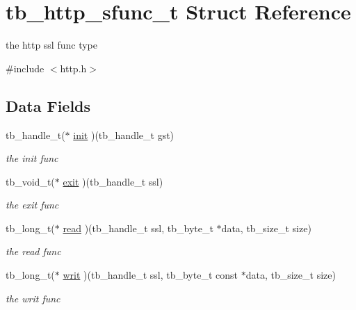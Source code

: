 \hypertarget{structtb__http__sfunc__t}{\section{tb\-\_\-http\-\_\-sfunc\-\_\-t Struct Reference}
\label{d7/dff/structtb__http__sfunc__t}
}


the http ssl func type  




{\ttfamily \#include $<$http.\-h$>$}

\subsection*{Data Fields}
\begin{DoxyCompactItemize}
\item 
\hypertarget{structtb__http__sfunc__t_a65b22704a942e1acb03be8c2fa8769e6}{tb\-\_\-handle\-\_\-t($\ast$ \hyperlink{structtb__http__sfunc__t_a65b22704a942e1acb03be8c2fa8769e6}{init} )(tb\-\_\-handle\-\_\-t gst)}\label{d7/dff/structtb__http__sfunc__t_a65b22704a942e1acb03be8c2fa8769e6}

\begin{DoxyCompactList}\small\item\em the init func \end{DoxyCompactList}\item 
\hypertarget{structtb__http__sfunc__t_a8d7394294f24e415a0ac34707f85c50f}{tb\-\_\-void\-\_\-t($\ast$ \hyperlink{structtb__http__sfunc__t_a8d7394294f24e415a0ac34707f85c50f}{exit} )(tb\-\_\-handle\-\_\-t ssl)}\label{d7/dff/structtb__http__sfunc__t_a8d7394294f24e415a0ac34707f85c50f}

\begin{DoxyCompactList}\small\item\em the exit func \end{DoxyCompactList}\item 
\hypertarget{structtb__http__sfunc__t_a2f5f30b0507bad91a37af38230340804}{tb\-\_\-long\-\_\-t($\ast$ \hyperlink{structtb__http__sfunc__t_a2f5f30b0507bad91a37af38230340804}{read} )(tb\-\_\-handle\-\_\-t ssl, tb\-\_\-byte\-\_\-t $\ast$data, tb\-\_\-size\-\_\-t size)}\label{d7/dff/structtb__http__sfunc__t_a2f5f30b0507bad91a37af38230340804}

\begin{DoxyCompactList}\small\item\em the read func \end{DoxyCompactList}\item 
\hypertarget{structtb__http__sfunc__t_af7926632bfe964584095993b21e5a9f7}{tb\-\_\-long\-\_\-t($\ast$ \hyperlink{structtb__http__sfunc__t_af7926632bfe964584095993b21e5a9f7}{writ} )(tb\-\_\-handle\-\_\-t ssl, tb\-\_\-byte\-\_\-t const $\ast$data, tb\-\_\-size\-\_\-t size)}\label{d7/dff/structtb__http__sfunc__t_af7926632bfe964584095993b21e5a9f7}

\begin{DoxyCompactList}\small\item\em the writ func \end{DoxyCompactList}\end{DoxyCompactItemize}


